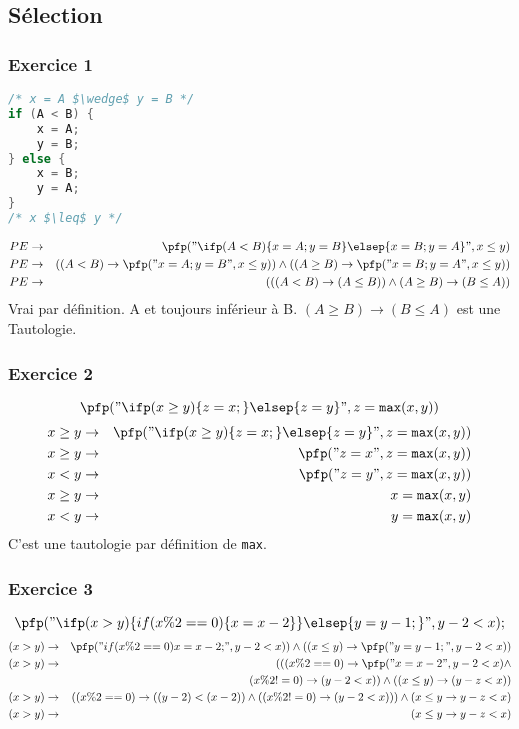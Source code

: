 \subsection{Sélection} \label{exoPfpSelect}
\subsubsection{Exercice 1}
\begin{lstlisting}[language=C]
/* x = A $\wedge$ y = B */
if (A < B) {
	x = A;
	y = B;
} else {
	x = B;
	y = A;
}
/* x $\leq$ y */ 
\end{lstlisting}
\begin{eqnarray*}
PE &\rightarrow& \pfp ("\ifp (A < B) \{ x = A; y = B\}\elsep \{ x = B; y =A\}", x \leq y)\\
PE&\rightarrow&((A<B)\rightarrow\pfp("x=A;y=B",x\leq y))\wedge((A\geq B)\rightarrow\pfp("x=B;y=A",x\leq y))\\
PE &\rightarrow& ((( A < B) \rightarrow (A \leq B)) \wedge (A \geq B ) \rightarrow (B \leq A))
\end{eqnarray*}
Vrai par définition. A et toujours inférieur à B. $(A \geq B) \rightarrow (B \leq A)$ est une Tautologie. 
\subsubsection{Exercice 2}
$$\pfp ("\ifp (x \geq y )\{z=x;\}\elsep\{z=y\}",z=\texttt{max}(x,y))$$
\begin{eqnarray*}
x \geq y  &\rightarrow&	\pfp ("\ifp (x \geq y )\{z=x;\}\elsep\{z=y\}",z=\texttt{max}(x,y))\\
x \geq y &\rightarrow& \pfp ("z = x", z = \texttt{max}(x,y))\\
x < y &\rightarrow& \pfp ("z = y", z = \texttt{max}(x,y))\\
x \geq y &\rightarrow& x = \texttt{max}(x,y)\\
x < y &\rightarrow& y = \texttt{max}(x,y)
\end{eqnarray*}
C'est une tautologie par définition de \texttt{max}.

\subsubsection{Exercice 3}
$$\pfp ("\ifp (x > y) \{ if(x \%2 ==  0) \{ x = x - 2\}\} \elsep \{y=y-1;\}", y-2 < x);$$
\begin{eqnarray*}
(x > y) &\rightarrow& \pfp("if(x\%2 == 0) { x = x-2; } ", y-2 < x)) \wedge ( ( x \leq y) \rightarrow \pfp ("y = y-1;", y - 2 < x) )\\
(x > y) &\rightarrow& ( ( (x \%2 = =0) \rightarrow \pfp ("x = x-2", y-2 < x) \wedge \\
& &(x \% 2 != 0) \rightarrow(y-2 < x)) \wedge ( (x \leq y) \rightarrow (y-z < x))\\ 
(x > y) &\rightarrow& ( (x\%2 = = 0)\rightarrow ( (y-2) < (x - 2) ) \wedge ( ( x\%2 != 0) \rightarrow (y-2 < x))) \wedge (x \leq y \rightarrow y-z < x) \\
(x > y) &\rightarrow& (x \leq y \rightarrow y - z < x)
\end{eqnarray*}
